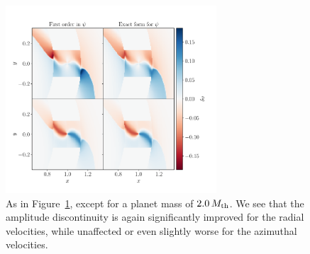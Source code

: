 \begin{figure}
    \centering
    \includegraphics[width = 0.7\textwidth]{figures/2_0_mth.pdf}
    \caption{As in Figure~\ref{fig:2_0mth}, except for a planet mass of $2.0 \, M_{\rm th}$. We see that the amplitude discontinuity is again significantly improved for the radial velocities, while unaffected or even slightly worse for the azimuthal velocities.}
    \label{fig:2_0mth}
\end{figure}

